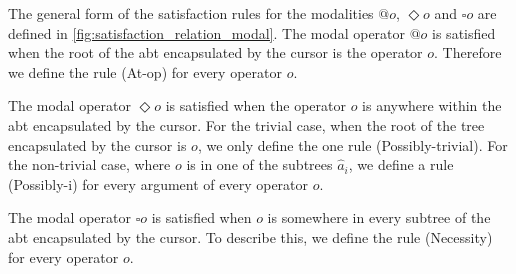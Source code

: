 \documentclass[sigplan,screen]{acmart}
\begin{document}
The general form of the satisfaction rules for the modalities $@o$, $\Diamond o$ and $\square o$ are defined in \cref{fig:satisfaction_relation_modal}. 
The modal operator $@o$ is satisfied when the root of the abt encapsulated by the cursor is the operator $o$. Therefore we define the rule (At-op) for every operator $o$.

The modal operator $\Diamond o$ is satisfied when the operator $o$ is anywhere within the abt encapsulated by the cursor. For the trivial case, when the root of the tree encapsulated by the cursor is $o$, we only define the one rule (Possibly-trivial). For the non-trivial case, where $o$ is in one of the subtrees $\hat{a}_i$, we define a rule (Possibly-i) for every argument of every operator $o$.

The modal operator $\square o$ is satisfied when $o$ is somewhere in every subtree of the abt encapsulated by the cursor. To describe this, we define the rule (Necessity) for every operator $o$.
\end{document}
